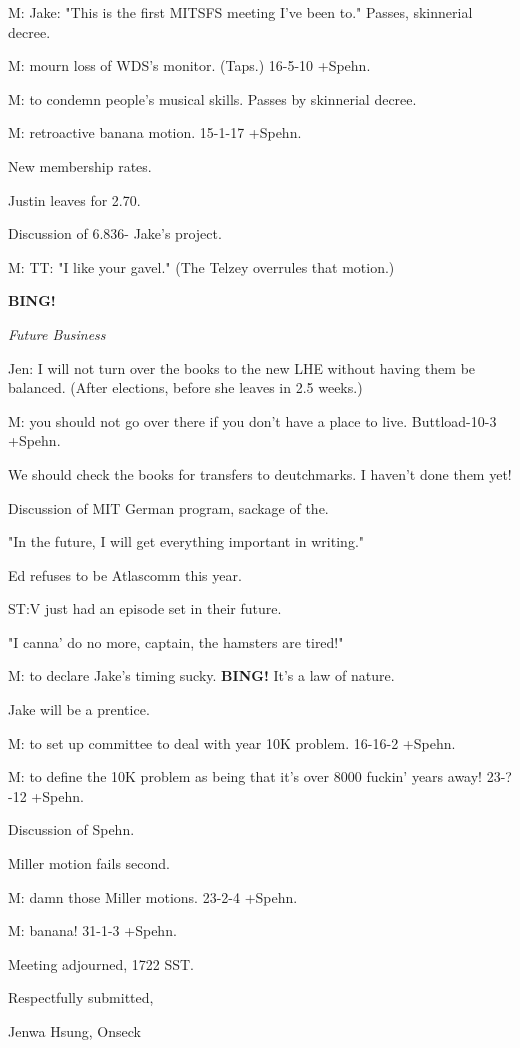 \documentclass[12pt]{article}
\newcommand{\bing}{{\bf BING!} }
\newcommand{\goto}[1]{\bing \vskip 12pt \centerline{{\em{#1}}}}
\begin{document}
M: Jake: "This is the first MITSFS meeting I've been to." Passes, skinnerial decree.

M: mourn loss of WDS's monitor. (Taps.) 16-5-10 +Spehn.

M: to condemn people's musical skills. Passes by skinnerial decree.

M: retroactive banana motion. 15-1-17 +Spehn.

New membership rates.

Justin leaves for 2.70.

Discussion of 6.836- Jake's project.

M: TT: "I like your gavel." (The Telzey overrules that motion.)

\goto{Future Business}

Jen: I will not turn over the books to the new LHE without having them be balanced. (After elections, before she leaves in 2.5 weeks.)

M: you should not go over there if you don't have a place to live. Buttload-10-3 +Spehn.

We should check the books for transfers to deutchmarks. I haven't done them yet!

Discussion of MIT German program, sackage of the.

"In the future, I will get everything important in writing."

Ed refuses to be Atlascomm this year.

ST:V just had an episode set in their future.

"I canna' do no more, captain, the hamsters are tired!"

M: to declare Jake's timing sucky. \bing It's a law of nature.

Jake will be a prentice.

M: to set up committee to deal with year 10K problem. 16-16-2 +Spehn.

M: to define the 10K problem as being that it's over 8000 fuckin' years away! 23-?-12 +Spehn.

Discussion of Spehn.

Miller motion fails second.

M: damn those Miller motions. 23-2-4 +Spehn.

M: banana! 31-1-3 +Spehn.

\vspace{12pt}

\noindent
Meeting adjourned, 1722 SST.

\vspace{18pt}

\centerline{Respectfully submitted,}
\centerline{Jenwa Hsung, Onseck}
\end{document}
